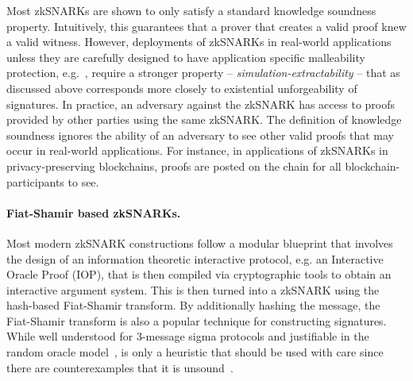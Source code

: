 Most zkSNARKs are shown to only satisfy a standard knowledge soundness
property. Intuitively, this guarantees that a prover that creates a valid proof knew
a valid witness. However, deployments of zkSNARKs in real-world applications unless
they are carefully designed to have application specific malleability protection,
e.g.~\cite{SP:BCGGMT14}, require a stronger property --
\textit{simulation-extractability} -- that as discussed above corresponds more
closely to existential unforgeability of signatures.  In practice, an adversary
against the zkSNARK has access to proofs provided by other parties using the same
zkSNARK.  The definition of knowledge soundness ignores the ability of an adversary
to see other valid proofs that may occur in real-world applications.  For instance,
in applications of zkSNARKs in privacy-preserving blockchains, proofs are posted on
the chain for all blockchain-participants to see.

\paragraph{Fiat-Shamir based zkSNARKs.}
Most modern zkSNARK constructions follow a modular blueprint that involves the design of an information theoretic interactive protocol, e.g. an Interactive Oracle Proof (IOP), that is then compiled via cryptographic tools to obtain an interactive argument system.  This is then turned into a zkSNARK using the hash-based Fiat-Shamir transform. By additionally hashing the message, the Fiat-Shamir transform is also a popular technique for constructing signatures. While well understood for 3-message sigma protocols and justifiable in the random oracle
model~\cite{CCS:BelRog93}, is only a heuristic that should be used with
care since there are counterexamples that it is
unsound~\cite{FOCS:GolKal03}.

